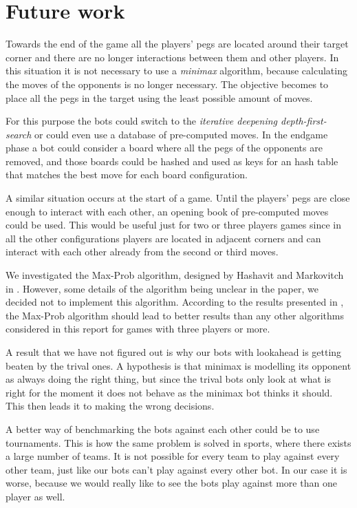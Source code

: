 
\section{Future work}

Towards the end of the game all the players' pegs are located around
their target corner and there are no longer interactions between them
and other players. In this situation it is not necessary to use a
\emph{minimax} algorithm, because calculating the moves of the
opponents is no longer necessary. The objective becomes to place
all the pegs in the target using the least possible amount of moves.

For this purpose the bots could switch to the \emph{iterative
  deepening depth-first-search} or could even use a database of
pre-computed moves. In the endgame phase a bot could consider a board
where all the pegs of the opponents are removed, and those boards
could be hashed and used as keys for an hash table that matches the
best move for each board configuration.

A similar situation occurs at the start of a game.
Until the players' pegs are close enough to interact with each other, an opening
book of pre-computed moves could be used. This would be useful just for two or
three players games since in all the other configurations players are located in
adjacent corners and can interact with each other already from the
second or third moves.

We investigated the Max-Prob algorithm, designed by Hashavit and
Mar\-ko\-vi\-tch in \cite{Hashavit}. However, some details of the
algorithm being unclear in the paper, we decided not to implement this
algorithm. According to the results presented in \cite{Hashavit}, the
Max-Prob algorithm should lead to better results than any other
algorithms considered in this report for games with three players or
more.



A result that we have not figured out is why our bots with lookahead
is getting beaten by the trival ones. A hypothesis is that minimax is
modelling its opponent as always doing the right thing, but since the
trival bots only look at what is right for the moment it does not
behave as the minimax bot thinks it should. This then leads it to
making the wrong decisions.

A better way of benchmarking the bots against each other could be to
use tournaments. This is how the same problem is solved in sports,
where there exists a large number of teams. It is not possible for
every team to play against every other team, just like our bots can't
play against every other bot. In our case it is worse, because we
would really like to see the bots play against more than one player as
well.
